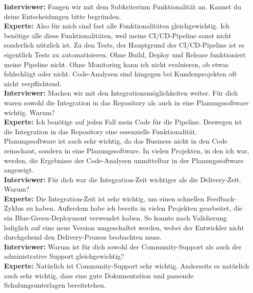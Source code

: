 \begin{center}
\begin{figure}[H]
    \centering
    \label{fig:gew_43}
\end{figure}	
\end{center}
\newpage
\resetlinenumber
\begin{linenumbers}
    \textbf{Interviewer:} Fangen wir mit dem Subkriterium Funktionalität an. Kannst du deine Entscheidungen bitte begründen.\\
    \textbf{Experte:} Also für mich sind fast alle Funktionalitäten gleichgewichtig. Ich benötige alle diese Funktionalitäten, weil meine CI/CD-Pipeline sonst nicht sonderlich nützlich ist. Zu den Tests, der Hauptgrund der CI/CD-Pipeline ist es eigentlich Tests zu automatisieren. Ohne Build, Deploy und Release funktioniert meine Pipeline nicht. Ohne Monitoring kann ich nicht evaluieren, ob etwas fehlschlägt oder nicht. Code-Analysen sind hingegen bei Kundenprojekten oft nicht verpflichtend.\\
    \textbf{Interviewer:} Machen wir mit den Integrationsmöglichkeiten weiter. Für dich waren sowohl die Integration in das Repository als auch in eine Planungssoftware wichtig. Warum?\\
    \textbf{Experte:} Ich benötige auf jeden Fall mein Code für die Pipeline. Deswegen ist die Integration in das Repository eine essenzielle Funktionalität. Planungssoftware ist auch sehr wichtig, da das Business nicht in den Code reinschaut, sondern in eine Planungssoftware. In vielen Projekten, in den ich war, werden, die Ergebnisse der Code-Analysen unmittelbar in der Planungssoftware angezeigt.\\
    \textbf{Interviewer:} Für dich war die Integration-Zeit wichtiger als die Delivery-Zeit. Warum?\\
    \textbf{Experte:} Die Integration-Zeit ist sehr wichtig, um einen schnellen Feedback-Zyklus zu haben. Außerdem habe ich bereits in vielen Projekten gearbeitet, die ein Blue-Green-Deployment verwendet haben. So konnte nach Validierung lediglich auf eine neue Version umgeschaltet werden, wobei der Entwickler nicht durchgehend den Delivery-Prozess beobachten muss.\\ 
    \textbf{Interviewer:} Warum ist für dich sowohl der Community-Support als auch der administrative Support gleichgewichtig?\\
    \textbf{Experte:} Natürlich ist Community-Support sehr wichtig. Anderseits es natürlich auch sehr wichtig, dass eine gute Dokumentation und passende Schulungsunterlagen bereitstehen. \\

\end{linenumbers}
